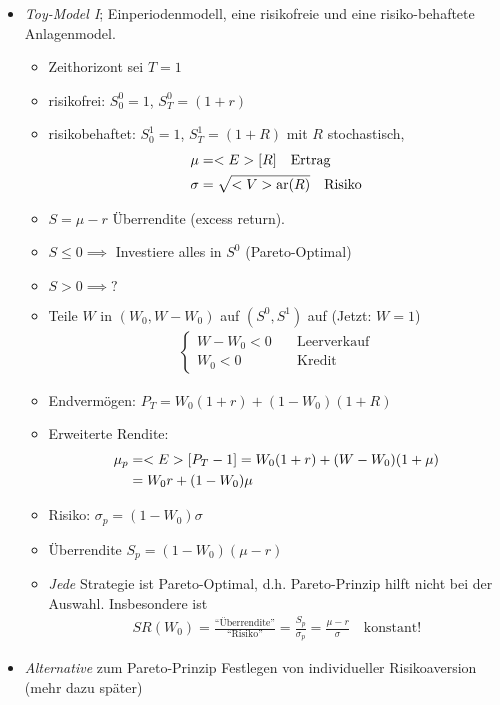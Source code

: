 \begin{itemize} %
	\item \emph{Toy-Model I}; Einperiodenmodell, eine risikofreie und eine risiko-behaftete Anlagenmodel.
	\begin{itemize}
		\item Zeithorizont sei $T=1$
		\item risikofrei: $S_0^0 = 1$, $S_T^0 = (1+r)$
		\item risikobehaftet: $S_0^1 = 1$, $S_T^1 = (1+R)$ mit $R$ stochastisch,
		\begin{align*}
			\mu &= <E>[R] \quad \text{Ertrag}\\
			\sigma &= \sqrt{<V>\text{ar}(R)} \quad \text{Risiko}
		\end{align*}
		\item $S=\mu -r$ Überrendite (excess return).
		\item $S \le 0 \implies$ Investiere alles in $S^0$ (Pareto-Optimal)
		\item $S > 0 \implies ?$
		\item Teile $W$ in $(W_0, W-W_0)$ auf $(S^0,S^1)$ auf (Jetzt: $W=1$)
		\begin{align*}
			\begin{cases}
				W-W_0 < 0 &\quad \text{Leerverkauf}\\
				W_0 < 0 &\quad \text{Kredit}
			\end{cases}
		\end{align*}
		\item Endvermögen: $P_T = W_0(1+r) + (1-W_0)(1+R)$
		\item Erweiterte Rendite: 
		\begin{align*}
			\mu_p &= <E>[P_T-1] = W_0(1+r)+(W-W_0)(1+\mu)\\
			&= W_0 r + (1-W_0)\mu\\
		\end{align*}
		\item Risiko: $\sigma_p = (1-W_0)\sigma$
		\item Überrendite $S_p = (1-W_0)(\mu -r)$
		\item \emph{Jede} Strategie ist Pareto-Optimal, d.h. Pareto-Prinzip  hilft nicht bei der Auswahl. Insbesondere ist  
		\begin{align*}
			SR(W_0) = \frac{\text{``Überrendite''}}{\text{``Risiko''}} = \frac{S_p}{\sigma_p} = \frac{\mu -r}{\sigma} \quad \text{konstant!}
		\end{align*}
	\end{itemize}
	\item \emph{Alternative} zum Pareto-Prinzip Festlegen von individueller Risikoaversion (mehr dazu später)

\end{itemize}
